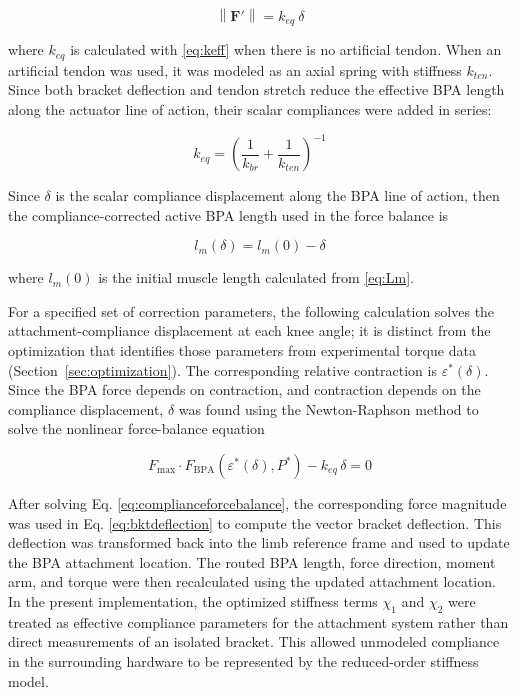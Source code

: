 \begin{equation} \left\| \mathbf{F}' \right\| = k_{eq} \: \delta
\label{eq:hookereduced}
\end{equation}

where $k_{eq}$ is calculated with \eqref{eq:keff} when there is no artificial tendon. When an artificial tendon was used, it was modeled as an axial spring with stiffness $k_{ten}$. Since both bracket deflection and tendon stretch reduce the effective BPA length along the actuator line of action, their scalar compliances were added in series:

\begin{equation} k_{eq} = \left( \frac{1}{k_{br}} + \frac{1}{k_{ten}} \right)^{-1}
\label{eq:equivalentstiffness}
\end{equation}

Since $\delta$ is the scalar compliance displacement along the BPA line of action, then the compliance-corrected active BPA length used in the force balance is

\begin{equation} l_m(\delta) = l_m{(0)} - \delta
\label{eq:activelengthcorrected}
\end{equation}

where $l_m{(0)}$ is the initial muscle length calculated from \eqref{eq:Lm}.

For a specified set of correction parameters, the following calculation solves the attachment-compliance displacement at each knee angle; it is distinct from the optimization that identifies those parameters from experimental torque data (Section~\ref{sec:optimization}). The corresponding relative contraction is $\varepsilon^*(\delta)$. Since the BPA force depends on contraction, and contraction depends on the compliance displacement, $\delta$ was found using the Newton-Raphson method to solve the nonlinear force-balance equation

\begin{equation} F_{\mathrm{max}} \cdot F_{\mathrm{BPA}}\!\left(\varepsilon^*(\delta),P^*\right) - k_{eq}\,\delta = 0
\label{eq:complianceforcebalance}
\end{equation}

After solving Eq. \ref{eq:complianceforcebalance}, the corresponding force magnitude was used in Eq. \ref{eq:bktdeflection} to compute the vector bracket deflection. This deflection was transformed back into the limb reference frame and used to update the BPA attachment location. The routed BPA length, force direction, moment arm, and torque were then recalculated using the updated attachment location. In the present implementation, the optimized stiffness terms $\chi_{1}$ and $\chi_{2}$ were treated as effective compliance parameters for the attachment system rather than direct measurements of an isolated bracket. This allowed unmodeled compliance in the surrounding hardware to be represented by the reduced-order stiffness model.





